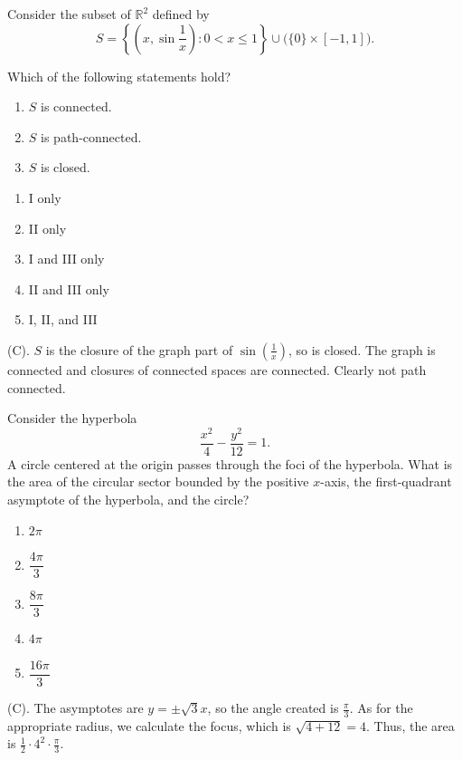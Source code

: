 \begin{exercise}
Consider the subset of $\mathbb R^2$
defined by
\[
S=
\left\{
\left(x,\sin\frac1x\right):
0<x\le1
\right\}
\cup
\bigl(\{0\}\times[-1,1]\bigr).
\]

Which of the following statements hold?

\begin{enumerate}[label=\Roman*.]
    \item $S$ is connected.
    \item $S$ is path-connected.
    \item $S$ is closed.
\end{enumerate}

\begin{enumerate}[label=(\Alph*)]
    \item I only
    \item II only
    \item I and III only
    \item II and III only
    \item I, II, and III
\end{enumerate}
\end{exercise}
\begin{solution}
(C). $S$ is the closure of the graph part of $\sin\left(\frac{1}{x}\right)$, so is closed.
The graph is connected and closures of connected spaces are connected. Clearly not path connected.
\end{solution}

\begin{exercise}
Consider the hyperbola
\[
\frac{x^2}{4}-\frac{y^2}{12}=1.
\]
A circle centered at the origin passes
through the foci of the hyperbola. What is the area of the circular sector
bounded by the positive $x$-axis, the first-quadrant asymptote of the 
hyperbola, and the circle?
\begin{enumerate}[label=(\Alph*)]
    \item $2\pi$
    \item $\dfrac{4\pi}{3}$
    \item $\dfrac{8\pi}{3}$
    \item $4\pi$
    \item $\dfrac{16\pi}{3}$
\end{enumerate}
\end{exercise}
\begin{solution}
(C). The asymptotes are $y = \pm \sqrt{3}x$, so the angle created is $\frac{\pi}{3}$.
As for the appropriate radius, we calculate the focus, which is $\sqrt{4 + 12} = 4$.
Thus, the area is $\frac{1}{2}\cdot4^2\cdot\frac{\pi}{3}$.
\end{solution}

